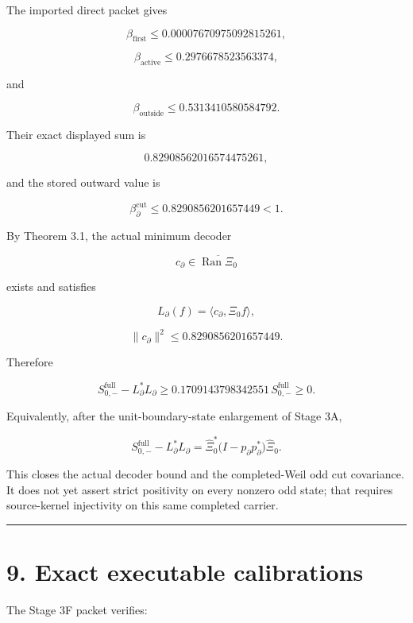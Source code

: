 The imported direct packet gives

\[
\beta_{\mathrm{first}}
\le
0.00007670975092815261,
\]

\[
\beta_{\mathrm{active}}
\le
0.2976678523563374,
\]

and

\[
\beta_{\mathrm{outside}}
\le
0.5313410580584792.
\]

Their exact displayed sum is

\[
0.82908562016574475261,
\]

and the stored outward value is

\[
\boxed{
\beta_\partial^{\mathrm{cut}}
\le
0.8290856201657449
<1.
}
\tag{8.1}
\]

By Theorem 3.1, the actual minimum decoder

\[
c_\partial
\in
\overline{\operatorname{Ran}\Xi_0}
\]

exists and satisfies

\[
L_\partial(f)
=
\langle c_\partial,\Xi_0f\rangle,
\]

\[
\|c_\partial\|^2
\le
0.8290856201657449.
\]

Therefore

\[
\boxed{
S_{0,-}^{\mathrm{full}}
-
L_\partial^*L_\partial
\ge
0.1709143798342551\,
S_{0,-}^{\mathrm{full}}
\ge0.
}
\tag{8.2}
\]

Equivalently, after the unit-boundary-state enlargement of Stage 3A,

\[
\boxed{
S_{0,-}^{\mathrm{full}}
-
L_\partial^*L_\partial
=
\widehat\Xi_0^*
\bigl(I-p_\partial p_\partial^*\bigr)
\widehat\Xi_0.
}
\tag{8.3}
\]

This closes the actual decoder bound and the completed-Weil odd cut covariance.
It does not yet assert strict positivity on every nonzero odd state; that
requires source-kernel injectivity on this same completed carrier.

\begin{center}\rule{0.5\linewidth}{0.5pt}\end{center}

\hypertarget{exact-executable-calibrations}{%
\section{9. Exact executable calibrations}\label{exact-executable-calibrations}}

The Stage 3F packet verifies:

